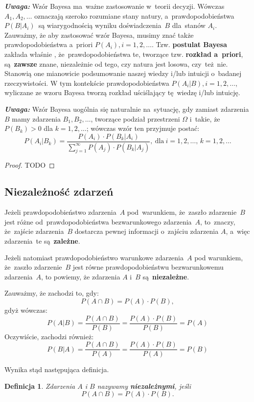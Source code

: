 \documentclass[10pt,a4paper]{article}
\newtheorem{definition}{Definicja}[section]
\newcommand{\Warning}{\marginpar{\dbend}\textbf{\textit{Uwaga: }}}
\begin{document}
\Warning Wzór Bayesa ma~ważne zastosowanie w~teorii decyzji. Wówczas
$A_1,A_2,\dotsc$ oznaczają szeroko rozumiane stany natury, a~prawdopodobieństwa
$P(B|A_i)$~są wiarygodnością wyniku doświadczenia~$B$ dla~stanów $A_i$. Zauważmy,
że aby zastosować wzór Bayesa, musimy znać także prawdopodobieństwa a~priori
$P(A_i), i=1,2,\dotsc$. Tzw. \textbf{postulat Bayesa} zakłada właśnie
, że~prawdopodobieństwa te, tworzące tzw. \textbf{rozkład a~priori},
są~\textbf{zawsze} znane, niezależnie od tego, czy natura jest losowa,
czy~też~nie. Stanowią one mianowicie podsumowanie naszej wiedzy i/lub
intuicji o~badanej rzeczywistości. W tym kontekście prawdopodobieństwa
$P(A_i|B), i=1,2,\dotsc$, wyliczane ze wzoru Bayesa tworzą rozkład uściślający
tę~wiedzę i/lub intuicję.

\Warning Wzór Bayesa uogólnia się naturalnie
na~sytuację, gdy zamiast zdarzenia $B$ mamy zdarzenia $B_1,B_2,\dotsc$, tworzące
podział przestrzeni $\Omega$ i~takie, że $P(B_k)>0$ dla $k=1,2,\dotsc$; wówczas
wzór ten przyjmuje postać:
\begin{equation}
  P(A_i|B_k) = \frac{P(A_i)\cdot P(B_k|A_i)}{\sum_{j=1}^{\infty}P(A_j)\cdot
    P(B_k|A_j)},\:\textrm{dla}\:i=1,2,\dotsc,\,k=1,2,\dotsc
\end{equation}
\begin{proof}
  TODO
\end{proof}

\subsection{Niezależność zdarzeń}
Jeżeli prawdopodobieństwo zdarzenia~$A$ pod~warunkiem, że~zaszło zdarzenie~$B$
jest różne od~prawdopodobieństwa bezwarunkowego zdarzenia~$A$, to~znaczy,
że~zajście zdarzenia~$B$ dostarcza pewnej informacji o~zajściu zdarzenia $A$,
a~więc zdarzenia~te są~\textbf{zależne}.

Jeżeli natomiast prawdopodobieństwo warunkowe zdarzenia~$A$ pod warunkiem,
że~zaszło zdarzenie~$B$ jest równe prawdopodobieństwu bezwarunkowemu
zdarzenia~$A$, to powiemy, że zdarzenia $A$ i~$B$ są~\textbf{niezależne}.

Zauważmy, że zachodzi to, gdy:
\[
  P(A\cap B) = P(A)\cdot P(B),
\]
gdyż wówczas:
\[
  P(A|B)=\frac{P(A\cap B)}{P(B)}=\frac{P(A)\cdot P(B)}{P(B)} = P(A)
\]
Oczywiście, zachodzi również:
\[
  P(B|A)=\frac{P(A\cap B)}{P(A)}=\frac{P(A)\cdot P(B)}{P(A)} = P(B)
\]

Wynika stąd następująca definicja.

\begin{definition}
  Zdarzenia $A$ i $B$ nazywamy \textbf{niezależnymi}, jeśli
  \begin{equation}
    P(A\cap B)=P(A)\cdot P(B).
  \end{equation}
\end{definition}
\end{document}
